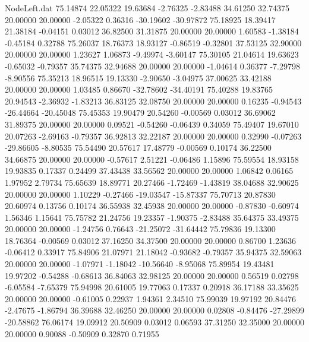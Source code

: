 \begin{filecontents}{NodeLeft.dat}
  75.14874   22.05322   19.63684    -2.76325   -2.83488   34.61250   32.74375   20.00000   20.00000   -2.05322    0.36316  -30.19602  -30.97872
  75.18925   18.39417   21.38184    -0.04151    0.03012   36.82500   31.31875   20.00000   20.00000    1.60583   -1.38184   -0.45184    0.32788
  75.26037   18.76373   18.93127    -0.86519   -0.32801   37.53125   32.90000   20.00000   20.00000    1.23627    1.06873   -9.49974   -3.60147
  75.30105   21.04614   19.63623    -0.65032   -0.79357   35.74375   32.94688   20.00000   20.00000   -1.04614    0.36377   -7.29798   -8.90556
  75.35213   18.96515   19.13330    -2.90650   -3.04975   37.00625   33.42188   20.00000   20.00000    1.03485    0.86670  -32.78602  -34.40191
  75.40288   19.83765   20.94543    -2.36932   -1.83213   36.83125   32.08750   20.00000   20.00000    0.16235   -0.94543  -26.44664  -20.45048
  75.45353   19.90479   20.54260    -0.00569    0.03012   36.69062   31.89375   20.00000   20.00000    0.09521   -0.54260   -0.06439    0.34059
  75.49407   19.67010   20.07263    -2.69163   -0.79357   36.92813   32.22187   20.00000   20.00000    0.32990   -0.07263  -29.86605   -8.80535
  75.54490   20.57617   17.48779    -0.00569    0.10174   36.22500   34.66875   20.00000   20.00000   -0.57617    2.51221   -0.06486    1.15896
  75.59554   18.93158   19.93835     0.17337    0.24499   37.43438   33.56562   20.00000   20.00000    1.06842    0.06165    1.97952    2.79734
  75.65639   18.89771   20.27466    -1.72469   -1.43819   38.04688   32.90625   20.00000   20.00000    1.10229   -0.27466  -19.03547  -15.87337
  75.70713   20.87830   20.60974     0.13756    0.10174   36.55938   32.45938   20.00000   20.00000   -0.87830   -0.60974    1.56346    1.15641
  75.75782   21.24756   19.23357    -1.90375   -2.83488   35.64375   33.49375   20.00000   20.00000   -1.24756    0.76643  -21.25072  -31.64442
  75.79836   19.13300   18.76364    -0.00569    0.03012   37.16250   34.37500   20.00000   20.00000    0.86700    1.23636   -0.06412    0.33917
  75.84906   21.07971   21.18042    -0.93682   -0.79357   35.94375   32.59063   20.00000   20.00000   -1.07971   -1.18042  -10.56640   -8.95068
  75.89954   19.43481   19.97202    -0.54288   -0.68613   36.84063   32.98125   20.00000   20.00000    0.56519    0.02798   -6.05584   -7.65379
  75.94998   20.61005   19.77063     0.17337    0.20918   36.17188   33.35625   20.00000   20.00000   -0.61005    0.22937    1.94361    2.34510
  75.99039   19.97192   20.84476    -2.47675   -1.86794   36.39688   32.46250   20.00000   20.00000    0.02808   -0.84476  -27.29899  -20.58862
  76.06174   19.09912   20.50909     0.03012    0.06593   37.31250   32.35000   20.00000   20.00000    0.90088   -0.50909    0.32870    0.71955

\end{filecontents}
